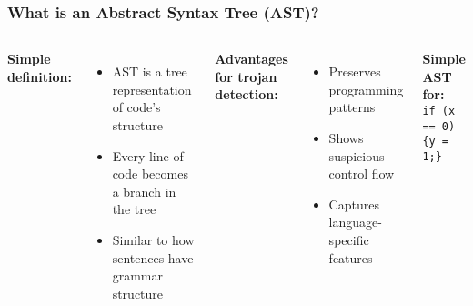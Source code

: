\documentclass[aspectratio=169]{beamer}
\begin{document}
\begin{frame}
\frametitle{What is an Abstract Syntax Tree (AST)?}
\begin{columns}
\textbf{Simple definition:}
\begin{itemize}
    \item AST is a tree representation of code's structure
    \item Every line of code becomes a branch in the tree
    \item Similar to how sentences have grammar structure
\end{itemize}

\textbf{Advantages for trojan detection:}
\begin{itemize}
    \item Preserves programming patterns
    \item Shows suspicious control flow
    \item Captures language-specific features
\end{itemize}


\textbf{Simple AST for:}\\
\texttt{if (x == 0) \{y = 1;\}}
\end{columns}
\end{frame}
\end{document}
